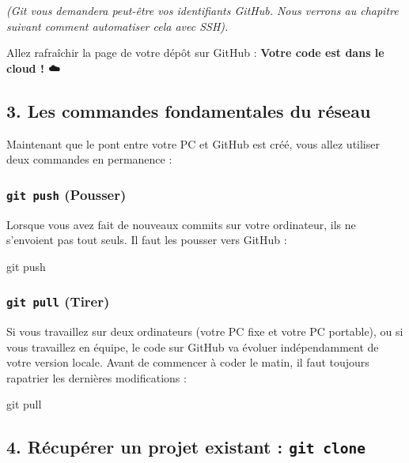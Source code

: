 \documentclass[
  letterpaper,
  DIV=11,
  numbers=noendperiod]{scrreprt}
\newenvironment{Shaded}{\begin{snugshade}}{\end{snugshade}}
\newcommand{\FunctionTok}[1]{\textcolor[rgb]{0.28,0.35,0.67}{#1}}
\newcommand{\NormalTok}[1]{\textcolor[rgb]{0.00,0.23,0.31}{#1}}
\begin{document}
\emph{(Git vous demandera peut-être vos identifiants GitHub. Nous
verrons au chapitre suivant comment automatiser cela avec SSH).}

Allez rafraîchir la page de votre dépôt sur GitHub : \textbf{Votre code
est dans le cloud ! ☁️}

\subsection{3. Les commandes fondamentales du
réseau}\label{les-commandes-fondamentales-du-ruxe9seau}

Maintenant que le pont entre votre PC et GitHub est créé, vous allez
utiliser deux commandes en permanence :

\subsubsection{\texorpdfstring{\texttt{git\ push}
(Pousser)}{git push (Pousser)}}\label{git-push-pousser}

Lorsque vous avez fait de nouveaux commits sur votre ordinateur, ils ne
s'envoient pas tout seuls. Il faut les pousser vers GitHub :

\begin{Shaded}
\begin{Highlighting}[]
\FunctionTok{git}\NormalTok{ push}
\end{Highlighting}
\end{Shaded}

\subsubsection{\texorpdfstring{\texttt{git\ pull}
(Tirer)}{git pull (Tirer)}}\label{git-pull-tirer}

Si vous travaillez sur deux ordinateurs (votre PC fixe et votre PC
portable), ou si vous travaillez en équipe, le code sur GitHub va
évoluer indépendamment de votre version locale. Avant de commencer à
coder le matin, il faut toujours rapatrier les dernières modifications :

\begin{Shaded}
\begin{Highlighting}[]
\FunctionTok{git}\NormalTok{ pull}
\end{Highlighting}
\end{Shaded}

\subsection{\texorpdfstring{4. Récupérer un projet existant :
\texttt{git\ clone}}{4. Récupérer un projet existant : git clone}}\label{ruxe9cupuxe9rer-un-projet-existant-git-clone}
\end{document}
